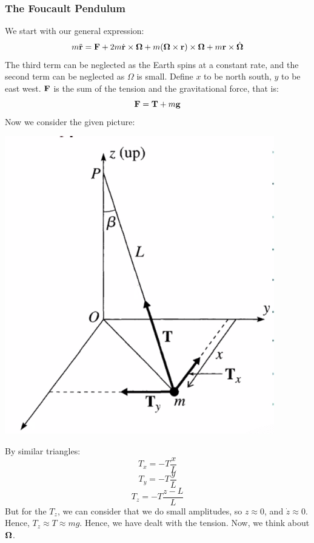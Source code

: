 \documentclass[../PHYS306Notes.tex]{subfiles}
\begin{document}
\subsubsection{The Foucault Pendulum}
We start with our general expression:
\[m\ddot{\mathbf{r}} = \mathbf{F} + 2m\dot{\mathbf{r}}\times \mathbf{\Omega} + m(\mathbf{\Omega} \times \mathbf{r})\times \mathbf{\Omega} + m\mathbf{r}\times \dot{\mathbf{\Omega}}\]
The third term can be neglected as the Earth spins at a constant rate, and the second term can be neglected as $\Omega$ is small. Define $x$ to be north south, $y$ to be east west. $\mathbf{F}$ is the sum of the tension and the gravitational force, that is:
\[\mathbf{F} = \mathbf{T} + m\mathbf{g}\]
Now we consider the given picture:
\begin{center}
    \includegraphics[scale=0.5]{Lecture-16/l16-img4.png}
\end{center}
By similar triangles:
\[T_x = -T\frac{x}{L}\]
\[T_y = -T\frac{y}{L}\]
\[T_z = -T\frac{z-L}{L}\]
But for the $T_z$, we can consider that we do small amplitudes, so $z \approx 0$, and $\dot{z} \approx 0$. Hence, $T_z \approx T \approx mg$. Hence, we have dealt with the tension. Now, we think about $\mathbf{\Omega}$.
\end{document}
